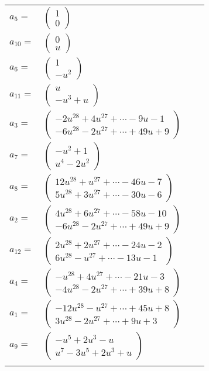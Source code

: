 \documentclass[1p]{elsarticle_modified}
\theoremstyle{definition}
\begin{document}
\begin{tabular}{m{7pt} m{180pt} m{7pt} m{180pt} }
\flushright $a_{5}=$&$\begin{pmatrix}1\\0\end{pmatrix}$ \\
\flushright $a_{10}=$&$\begin{pmatrix}0\\u\end{pmatrix}$ \\
\flushright $a_{6}=$&$\begin{pmatrix}1\\- u^2\end{pmatrix}$ \\
\flushright $a_{11}=$&$\begin{pmatrix}u\\- u^3+u\end{pmatrix}$ \\
\flushright $a_{3}=$&$\begin{pmatrix}-2 u^{28}+4 u^{27}+\cdots-9 u-1\\-6 u^{28}-2 u^{27}+\cdots+49 u+9\end{pmatrix}$ \\
\flushright $a_{7}=$&$\begin{pmatrix}- u^2+1\\u^4-2 u^2\end{pmatrix}$ \\
\flushright $a_{8}=$&$\begin{pmatrix}12 u^{28}+u^{27}+\cdots-46 u-7\\5 u^{28}+3 u^{27}+\cdots-30 u-6\end{pmatrix}$ \\
\flushright $a_{2}=$&$\begin{pmatrix}4 u^{28}+6 u^{27}+\cdots-58 u-10\\-6 u^{28}-2 u^{27}+\cdots+49 u+9\end{pmatrix}$ \\
\flushright $a_{12}=$&$\begin{pmatrix}2 u^{28}+2 u^{27}+\cdots-24 u-2\\6 u^{28}- u^{27}+\cdots-13 u-1\end{pmatrix}$ \\
\flushright $a_{4}=$&$\begin{pmatrix}- u^{28}+4 u^{27}+\cdots-21 u-3\\-4 u^{28}-2 u^{27}+\cdots+39 u+8\end{pmatrix}$ \\
\flushright $a_{1}=$&$\begin{pmatrix}-12 u^{28}- u^{27}+\cdots+45 u+8\\3 u^{28}-2 u^{27}+\cdots+9 u+3\end{pmatrix}$ \\
\flushright $a_{9}=$&$\begin{pmatrix}- u^5+2 u^3- u\\u^7-3 u^5+2 u^3+u\end{pmatrix}$\\&\end{tabular}
\end{document}
